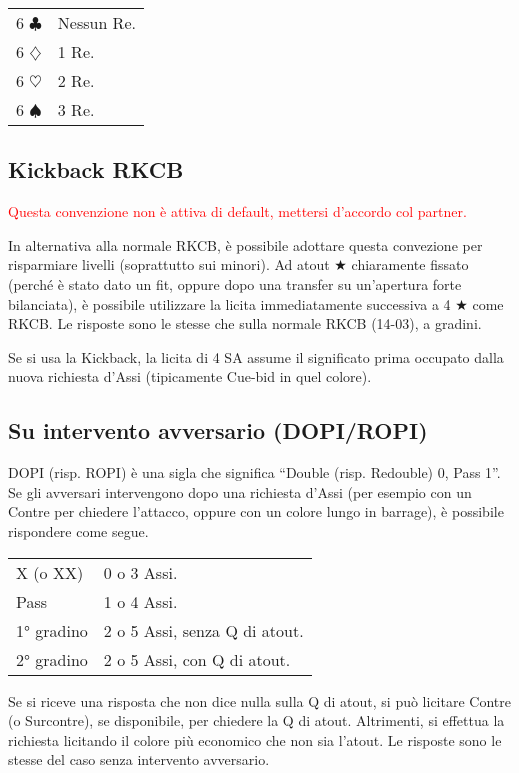 \documentclass[a4paper,10pt]{article}
\renewcommand{\c}{$\clubsuit$\xspace}
\renewcommand{\d}{$\diamondsuit$\xspace}
\newcommand{\h}{$\heartsuit$\xspace}
\newcommand{\s}{$\spadesuit$\xspace}
\renewcommand{\j}{$\bigstar$\xspace}
\newcommand{\sa}{SA\xspace}
\newcommand{\smallspace}{\vskip0.3cm}
\newcommand{\note}[1]{\textcolor{red}{#1}}
\newenvironment{twocol}
  {\smallspace\noindent\begin{tabular}{l p{0.78\textwidth}}}
  {\end{tabular}\smallspace}
\begin{document}
\begin{twocol}
6 \c & Nessun Re.\\
6 \d & 1 Re.\\
6 \h & 2 Re.\\
6 \s & 3 Re.
\end{twocol}

\subsection{Kickback RKCB}

\note{Questa convenzione non è attiva di default, mettersi d'accordo col partner.}

In alternativa alla normale RKCB, è possibile adottare questa convezione per risparmiare livelli (soprattutto sui minori). Ad atout \j chiaramente fissato (perché è stato dato un fit, oppure dopo una transfer su un'apertura forte bilanciata), è possibile utilizzare la licita immediatamente successiva a 4 \j come RKCB. Le risposte sono le stesse che sulla normale RKCB (14-03), a gradini.

Se si usa la Kickback, la licita di 4 \sa assume il significato prima occupato dalla nuova richiesta d'Assi (tipicamente Cue-bid in quel colore).

\subsection{Su intervento avversario (DOPI/ROPI)}

DOPI (risp. ROPI) è una sigla che significa ``Double (risp. Redouble) 0, Pass 1''. Se gli avversari intervengono dopo una richiesta d'Assi (per esempio con un Contre per chiedere l'attacco, oppure con un colore lungo in barrage), è possibile rispondere come segue.

\begin{twocol}
	X (o XX) & 0 o 3 Assi.\\
	Pass & 1 o 4 Assi.\\
	1° gradino & 2 o 5 Assi, senza Q di atout.\\
	2° gradino & 2 o 5 Assi, con Q di atout.
\end{twocol}

Se si riceve una risposta che non dice nulla sulla Q di atout, si può licitare Contre (o Surcontre), se disponibile, per chiedere la Q di atout. Altrimenti, si effettua la richiesta licitando il colore più economico che non sia l'atout. Le risposte sono le stesse del caso senza intervento avversario. 
\end{document}

